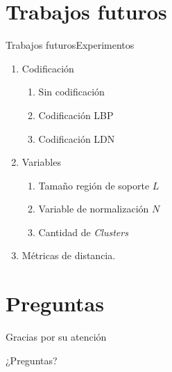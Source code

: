 \documentclass{beamer}
\begin{document}
\section{Trabajos futuros}
        \begin{frame}{Trabajos futuros}{Experimentos}
			\begin{enumerate}
				\item Codificación
					\begin{enumerate}
						\item Sin codificación
						\item Codificación LBP
						\item Codificación LDN
					\end{enumerate}
				\item Variables
					\begin{enumerate}
						\item Tamaño región de soporte $L$
						\item Variable de normalización $N$
						\item Cantidad de \textit{Clusters}
					\end{enumerate}
				\item Métricas de distancia.
			\end{enumerate}					        
        \end{frame}
    



\section*{Preguntas}
	\begin{frame}{Gracias por su atención}
		\begin{center}
			¿Preguntas?
		\end{center}
	\end{frame}
\end{document}

